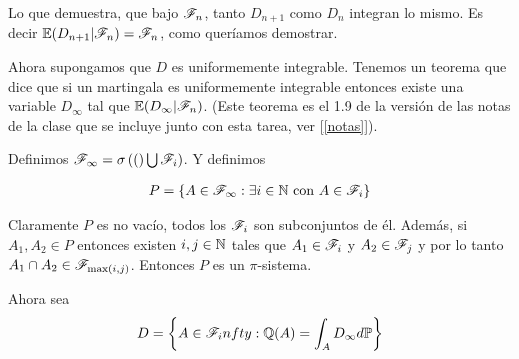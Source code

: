 \begin{itemize}
        Lo que demuestra, que bajo $\mathscr{F}_n$, tanto $D_{n+1}$ como $D_n$ integran lo mismo. Es decir
        $\mathbb{E}(D_{n+1} | \mathscr{F}_{n}) = \mathscr{F}_n$, como queríamos demostrar.\pn
\end{itemize}

Ahora supongamos que $D$ es uniformemente integrable. Tenemos un teorema que dice que si un martingala es 
uniformemente integrable entonces existe una variable $D_\infty$ tal que $\mathbb{E}(D_\infty | \mathscr{F}_n)$.
(Este teorema es el 1.9 de la versión de las notas de la clase que se incluye junto con esta tarea, 
ver [\ref{notas}]).\pn

Definimos $\mathscr{F}_\infty = \sigma\left( (\right) \bigcup \mathscr{F}_i)$. Y  definimos

\begin{align}
    P   =   \{ A \in \mathscr{F}_\infty : \exists i\in\mathbb{N} \text{  con  } A \in \mathscr{F}_i\}
\end{align}\pn

Claramente $P$ es no vacío, todos los $\mathscr{F}_i$ son subconjuntos de él. Además, si $A_1, A_2 \in P$ entonces
existen $i, j \in \mathbb{N}$ tales que $A_1 \in \mathscr{F}_i$ y $A_2 \in \mathscr{F}_j$ y por lo tanto $A_1 \cap A_2 \in \mathscr{F}_{\max(i,j)}$.
Entonces $P$ es un $\pi$-sistema.\pn

Ahora sea 
\begin{align}
    D   =   \bigg\{ A \in \mathscr{F}_infty   :   \mathbb{Q}(A) = \int_A D_\infty d\mathbb{P} \bigg\}
\end{align}